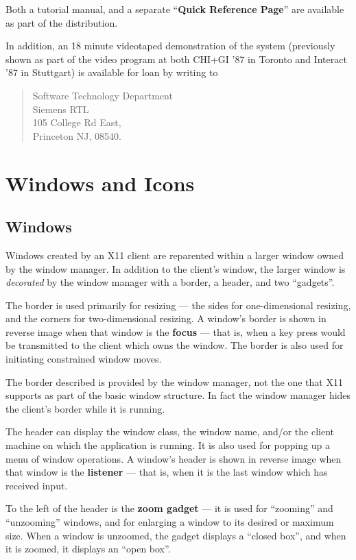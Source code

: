 Both a tutorial manual, and a separate ``{\bf Quick Reference Page}'' are
available as part of the distribution.

In addition, an 18 minute videotaped demonstration of the system
(previously shown as part of the video program at both CHI+GI '87
in Toronto and Interact '87 in Stuttgart) is available for loan
by writing to
\begin{verse}
Software Technology Department\\
Siemens RTL\\
105 College Rd East,\\
Princeton NJ, 08540.
\end{verse}

\section{Windows and Icons}

\subsection{Windows}

Windows created by an X11 client are reparented within a larger window
owned by the window manager.  In addition to the client's window,
the larger window is {\it decorated} by the window manager with
a border, a header, and two ``gadgets''.

The border is used primarily for resizing --- the sides for
one-dimensional resizing, and the corners for two-dimensional resizing.
A window's border is shown in reverse image when that window is the
{\bf focus} --- that is, when a key press would be transmitted to the
client which owns the window.  The border is also used for initiating
constrained window moves.

The border described is provided by the window manager, not the one that
X11 supports as part of the basic window structure.  In fact the window
manager hides the client's border while it is running.

The header can display the window class, the window name, and/or
the client machine on which the application is running.
It is also used for popping up a menu of window operations.
A window's header is shown in reverse image when that window is the
{\bf listener} --- that is, when it is the last window which has received input.

To the left of the header is the {\bf zoom gadget} --- it is used for
``zooming'' and ``unzooming'' windows, and for enlarging a window
to its desired or maximum size.  When a window is unzoomed, the
gadget displays a ``closed box'', and when it is zoomed, it displays an
``open box''.

